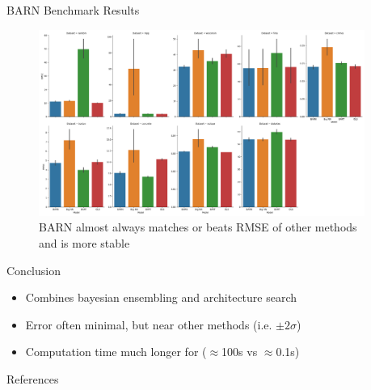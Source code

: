 \documentclass{beamer}
\newlength{\columnheight}
\begin{document}
\begin{frame}
\begin{columns}
\begin{column}{.33\textwidth}
	\end{column}
	\begin{column}{.33\textwidth}
	\begin{minipage}{.98\textwidth}  %
		\parbox[t][\columnheight]{\textwidth}{ %
		\begin{myblock}{BARN Benchmark Results}
\begin{figure}[h]
\centering
    \includegraphics[scale=.62]{pres_results.png}
    \caption{BARN almost always matches or beats RMSE of other methods and is more stable}
    \label{fig:results}
\end{figure}
		\end{myblock}
			\begin{myblock}{Conclusion}
\begin{itemize}
\item Combines bayesian ensembling and architecture search
\item Error often minimal, but near other methods (i.e. $\pm 2\sigma$)
\item Computation time much longer for ($\approx$100s vs $\approx$0.1s)
\end{itemize}
		\end{myblock}
		\begin{myblock}{References}
			\footnotesize
			
			
		\end{myblock}
		\vfill
		}
	\end{minipage}
	\end{column}
\end{columns}
\end{frame}
\end{document}

